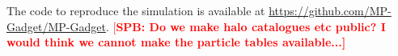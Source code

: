 \documentclass[fleqn,usenatbib]{mnras}
\newcommand{\spb}[1]{\textcolor{red}{[\bf SPB: #1]}}
\begin{document}
The code to reproduce the simulation is available at \url{https://github.com/MP-Gadget/MP-Gadget}. \spb{Do we make halo catalogues etc public? I would think we cannot make the particle tables available...}









\bsp	%
\label{lastpage}
\end{document}
